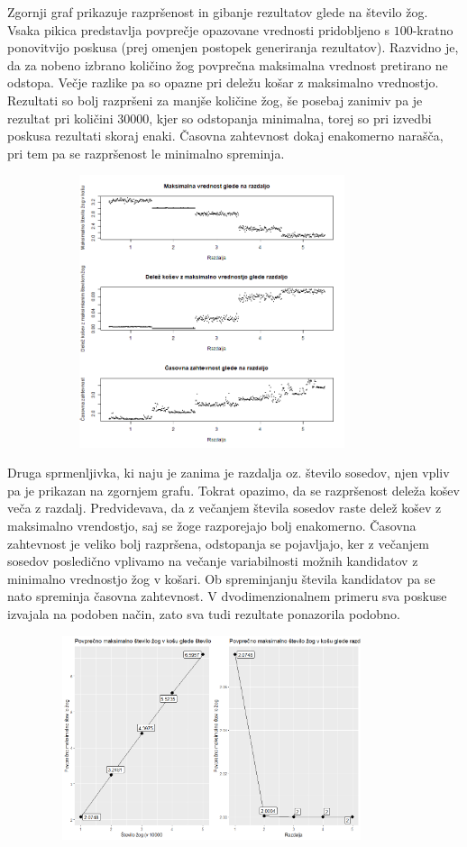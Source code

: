 \documentclass[a4paper, 11pt]{article}
\begin{document}
Zgornji graf prikazuje razpršenost in gibanje rezultatov glede na število žog. Vsaka pikica predstavlja povprečje opazovane vrednosti pridobljeno s $100$-kratno ponovitvijo poskusa (prej omenjen postopek generiranja rezultatov).
Razvidno je, da za nobeno izbrano količino žog povprečna maksimalna vrednost pretirano ne odstopa. Večje razlike pa so opazne pri deležu košar z maksimalno vrednostjo. Rezultati so bolj razpršeni za manjše količine žog, še posebaj zanimiv pa je rezultat
pri količini 30000, kjer so odstopanja minimalna, torej so pri izvedbi poskusa rezultati skoraj enaki.
Časovna zahtevnost dokaj enakomerno narašča, pri tem pa se razpršenost le minimalno spreminja.
 


\includegraphics[width=12cm, height= 8cm]{dim1_glede_na_razdaljo.png}

Druga sprmenljivka, ki naju je zanima je razdalja oz. število sosedov, njen vpliv pa je prikazan na zgornjem grafu.
Tokrat opazimo, da se razpršenost deleža košev veča z razdalj. Predvidevava, da z večanjem števila sosedov raste delež košev z maksimalno vrendostjo, saj se žoge razporejajo bolj enakomerno.
Časovna zahtevnost je veliko bolj razpršena, odstopanja se pojavljajo, ker z večanjem sosedov posledično vplivamo na večanje variabilnosti možnih kandidatov z minimalno vrednostjo žog v košari. Ob spreminjanju števila kandidatov pa se nato spreminja časovna zahtevnost.
\bigbreak
V dvodimenzionalnem primeru sva poskuse izvajala na podoben način, zato sva tudi rezultate ponazorila podobno.

\includegraphics[width=12cm, height=6cm]{povprecje_2dim.png}
\end{document}

